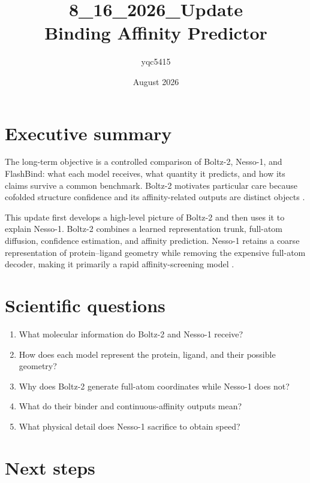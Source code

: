 \documentclass[11pt]{article}
\title{\textbf{8\_16\_2026\_Update}\\
Binding Affinity Predictor}
\author{yqc5415}
\date{August 2026}
\begin{document}
\maketitle

\section*{Executive summary}

The long-term objective is a controlled comparison of Boltz-2, Nesso-1, and
FlashBind: what each model receives, what quantity it predicts, and how its
claims survive a common benchmark. Boltz-2 motivates particular care because
cofolded structure confidence and its affinity-related outputs are distinct
objects \citep{passaro2025boltz2}.

This update first develops a high-level picture of Boltz-2 and then uses it to
explain Nesso-1. Boltz-2 combines a learned representation trunk, full-atom
diffusion, confidence estimation, and affinity prediction. Nesso-1 retains a
coarse representation of protein--ligand geometry while removing the expensive
full-atom decoder, making it primarily a rapid affinity-screening model
\citep{shenoy2026nesso1}.

\section{Scientific questions}

\begin{enumerate}
  \item What molecular information do Boltz-2 and Nesso-1 receive?
  \item How does each model represent the protein, ligand, and their possible
        geometry?
  \item Why does Boltz-2 generate full-atom coordinates while Nesso-1 does not?
  \item What do their binder and continuous-affinity outputs mean?
  \item What physical detail does Nesso-1 sacrifice to obtain speed?
\end{enumerate}





\section{Next steps}
\end{document}

